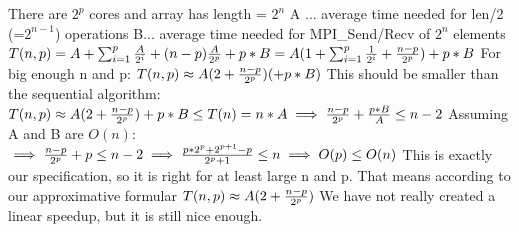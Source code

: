 There are \(2^{p}\) cores and array has length = \(2^{n}\)\newline
A ... average time needed for len/2 (=\(2^{n-1}\)) operations\newline
B... average time needed for MPI\_Send/Recv of \(2^{n}\) elements\newline\newline
\begin{math}
T(n, p) = A + \sum_{i=1}^{p} {A \over 2^i} + (n - p) {A \over 2^p} + p*B 
= A (1 + \sum_{i=1}^{p} {1 \over 2^i} + {n - p \over 2^p}) + p*B
\end{math}\newline\newline
For big enough n and p:\newline
\begin{math}
T(n, p) \approx A (2 + {n - p \over 2^p})(+ p * B)
\end{math}\newline\newline
This should be smaller than the sequential algorithm: \newline
\begin{math}
T(n, p) \approx A (2 + {n - p \over 2^p})+ p * B \leq T(n) = n * A
\implies {n - p \over 2^p} + {p*B \over A} \leq n - 2
\end{math}\newline\newline
Assuming A and B are \(O(n)\):\newline
\begin{math}
\implies {n - p \over 2^p} + p \leq n - 2 
\implies {p*2^p + 2^{p+1} -p \over 2^p +1} \leq n
\implies O(p) \leq O(n)
\end{math}\newline\newline
This is exactly our specification, so it is right for at least large n and p. That means according to our approximative formular \newline
\begin{math}
T(n, p) \approx A (2 + {n - p \over 2^p})
\end{math}\newline
We have not really created a linear speedup, but it is still nice enough.  